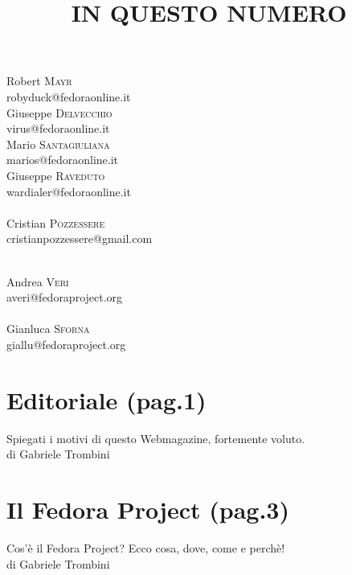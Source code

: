 \begin{titlepage}
\begin{minipage}{0.4\textwidth}
\begin{flushleft}
\bigskip
Robert \textsc{Mayr}\\
{\tiny robyduck@fedoraonline.it} \\
\bigskip
Giuseppe \textsc{Delvecchio}\\
{\tiny virus@fedoraonline.it} \\
\bigskip
Mario \textsc{Santagiuliana}\\
{\tiny marios@fedoraonline.it} \\
\bigskip
Giuseppe \textsc{Raveduto}\\
{\tiny wardialer@fedoraonline.it} \\
\bigskip
{\bfseries{}}\\
\bigskip
Cristian \textsc{Pozzessere}\\
{\tiny cristianpozzessere@gmail.com} \\
\end{flushleft}
\end{minipage}
\begin{minipage}{0.6\textwidth}
\begin{flushright} 
\singlespacing
\large
{\bfseries{}}\\
\bigskip
Andrea \textsc{Veri}\\
{\tiny averi@fedoraproject.org}\\
\bigskip
{\bfseries{}}\\
\bigskip
Gianluca \textsc{Sforna}\\
{\tiny giallu@fedoraproject.org}\\ 
\end{flushright}
\end{minipage}
\newpage
\flushcolumns
\twocolumn
\singlespacing
\title{\bfseries\color[cmyk]{0.5, 0, 1, 0} IN QUESTO NUMERO}
\date{}
\maketitle
\thispagestyle{empty} 
\normalsize
\flushbottom
\section*{\color[cmyk]{1, 0.57, 0, 0.38}Editoriale {\scriptsize(pag.1)}} \label{sec:Prima}
\small{Spiegati i motivi di questo Webmagazine, fortemente voluto.}\\ {\tiny di Gabriele Trombini}
\section*{\color[cmyk]{1, 0.57, 0, 0.38}Il Fedora Project {\scriptsize(pag.3)}} \label{sec:Seconda}
Cos'è il Fedora Project? Ecco cosa, dove, come e perchè!\\ {\tiny di Gabriele Trombini}

\end{titlepage}
